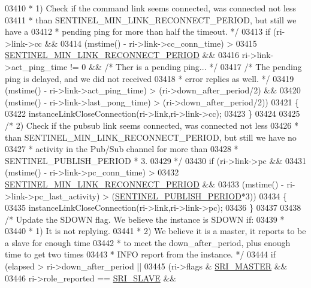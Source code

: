 \begin{DoxyCode}
{{{{{{{{{{{{{{{{{{{{{{{{{{{{{{{{{{{{{{{{{{{{{{{{{{{{{{{{{{{{{{{{{{{{{{{{{{03410 \textcolor{comment}{     * 1) Check if the command link seems connected, was connected not less}
03411 \textcolor{comment}{     *    than SENTINEL\_MIN\_LINK\_RECONNECT\_PERIOD, but still we have a}
03412 \textcolor{comment}{     *    pending ping for more than half the timeout. */}
03413     \textcolor{keywordflow}{if} (ri->link->cc &&
03414         (mstime() - ri->link->cc\_conn\_time) >
03415         \hyperlink{sentinel_8c_a55d7c0bf374af4867e1baaf1fc0860c3}{SENTINEL\_MIN\_LINK\_RECONNECT\_PERIOD} &&
03416         ri->link->act\_ping\_time != 0 && \textcolor{comment}{/* Ther is a pending ping... */}
03417         \textcolor{comment}{/* The pending ping is delayed, and we did not received}
03418 \textcolor{comment}{         * error replies as well. */}
03419         (mstime() - ri->link->act\_ping\_time) > (ri->down\_after\_period/2) &&
03420         (mstime() - ri->link->last\_pong\_time) > (ri->down\_after\_period/2))
03421     \{
03422         instanceLinkCloseConnection(ri->link,ri->link->cc);
03423     \}
03424 
03425     \textcolor{comment}{/* 2) Check if the pubsub link seems connected, was connected not less}
03426 \textcolor{comment}{     *    than SENTINEL\_MIN\_LINK\_RECONNECT\_PERIOD, but still we have no}
03427 \textcolor{comment}{     *    activity in the Pub/Sub channel for more than}
03428 \textcolor{comment}{     *    SENTINEL\_PUBLISH\_PERIOD * 3.}
03429 \textcolor{comment}{     */}
03430     \textcolor{keywordflow}{if} (ri->link->pc &&
03431         (mstime() - ri->link->pc\_conn\_time) >
03432          \hyperlink{sentinel_8c_a55d7c0bf374af4867e1baaf1fc0860c3}{SENTINEL\_MIN\_LINK\_RECONNECT\_PERIOD} &&
03433         (mstime() - ri->link->pc\_last\_activity) > (\hyperlink{sentinel_8c_a062c8bab2521f90dac2df11cf77c3bf0}{SENTINEL\_PUBLISH\_PERIOD}*3))
03434     \{
03435         instanceLinkCloseConnection(ri->link,ri->link->pc);
03436     \}
03437 
03438     \textcolor{comment}{/* Update the SDOWN flag. We believe the instance is SDOWN if:}
03439 \textcolor{comment}{     *}
03440 \textcolor{comment}{     * 1) It is not replying.}
03441 \textcolor{comment}{     * 2) We believe it is a master, it reports to be a slave for enough time}
03442 \textcolor{comment}{     *    to meet the down\_after\_period, plus enough time to get two times}
03443 \textcolor{comment}{     *    INFO report from the instance. */}
03444     \textcolor{keywordflow}{if} (elapsed > ri->down\_after\_period ||
03445         (ri->flags & \hyperlink{sentinel_8c_a2ee83e5ff67b45746cd6a310f15334b2}{SRI\_MASTER} &&
03446          ri->role\_reported == \hyperlink{sentinel_8c_a4b9db21eda79d49bd9fdf2cf7b3178e8}{SRI\_SLAVE} &&
}}}}}}}}}}}}}}}}}}}}}}}}}}}}}}}}}}}}}}}}}}}}}}}}}}}}}}}}}}}}}}}}}}}}}}}}}}
\end{DoxyCode}
